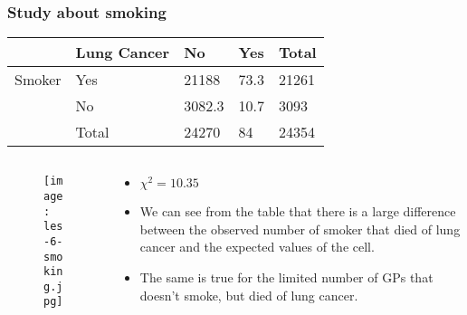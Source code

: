 \documentclass[aspectratio=169]{beamer}
\begin{document}
\begin{frame}
  \frametitle{Study about smoking}
  \begin{table}[h]
    \begin{tabular}{@{}lllll@{}}
      \toprule
      & \textbf{Lung Cancer} & \textbf{No} & \textbf{Yes} & \textbf{Total} \\ \midrule
      Smoker & Yes                 & 21188         & 73.3         & 21261           \\
      & No                & 3082.3        & 10.7         & 3093            \\
      & Total              & 24270         & 84           & 24354           \\ \bottomrule
    \end{tabular}
  \end{table}
  
  \begin{columns}
    \begin{column}{0.3 \textwidth}
      
      \begin{figure}
        \centering
        \texttt{[image: les-6-smoking.jpg]}
      \end{figure}
      
    \end{column}
    \begin{column}{0.7 \textwidth}
      
      \begin{itemize}
        \item $\chi^{2} = 10.35$
        \item We can see from the table that there is a large difference between the observed number of smoker that died of lung cancer and the expected values of the cell.
        \item The same is true for the limited number of GPs that doesn't smoke, but died of lung cancer.
      \end{itemize}
    \end{column}
  \end{columns}
\end{frame}
\end{document}
